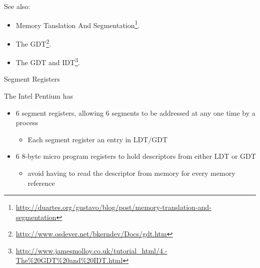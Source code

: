 See also:
\begin{itemize}
\item Memory Tanslation And Segmentation\footnote{\url{http://duartes.org/gustavo/blog/post/memory-translation-and-segmentation}}.
\item The GDT\footnote{\url{http://www.osdever.net/bkerndev/Docs/gdt.htm}}.
\item The GDT and IDT\footnote{\url{http://www.jamesmolloy.co.uk/tutorial_html/4.-The\%20GDT\%20and\%20IDT.html}}.
\end{itemize}

\begin{frame}{Segment Registers}
  \begin{iblock}{The Intel Pentium has}
    \begin{itemize}
    \item \alert{6 segment registers}, allowing 6 segments to be addressed at
      any one time by a process
      \begin{itemize}
      \item Each segment register {\pright} an entry in LDT/GDT
      \end{itemize}
    \item \alert{6 8-byte micro program registers} to hold descriptors from either LDT or GDT
      \begin{itemize}
      \item avoid having to read the descriptor from memory for every memory reference
      \end{itemize}
    \end{itemize}
  \end{iblock}
  \begin{center}
  \end{center}
\end{frame}


